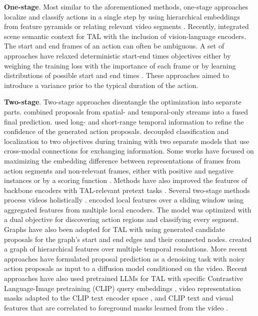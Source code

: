 \noindent
\textbf{One-stage}. Most similar to the aforementioned methods, one-stage approaches localize and classify actions in a single step by using hierarchical embeddings from feature pyramids  or relating relevant video segments . Recently,  integrated scene semantic context for TAL with the inclusion of vision-language encoders. The start and end frames of an action can often be ambiguous. A set of approaches have relaxed deterministic start-end times objectives either by weighing the training loss with the importance of each frame  or by
learning distributions of possible start and end times . These approaches aimed to introduce a variance prior to the typical duration of the action. 

\noindent
\textbf{Two-stage}. Two-stage approaches disentangle the optimization into separate parts.  combined proposals from spatial- and temporal-only streams into a fused final prediction.  used long- and short-range temporal information to refine the confidence of the generated action proposals.  decoupled classification and localization to two objectives during training with two separate models that use cross-modal connections for exchanging information. Some works have focused on maximizing the embedding difference between representations of frames from action segments and non-relevant frames, either with positive and negative instances  or by a scoring function . Methods have also improved the features of backbone encoders with TAL-relevant pretext tasks . Several two-stage methods process videos holistically .  encoded local features over a sliding window using aggregated features from multiple local encoders. The model was optimized with a dual objective for discovering action regions and classifying every segment. Graphs have also been adopted for TAL with  using generated candidate proposals for the graph's start and end edges and their connected nodes.  created a graph of hierarchical features over multiple temporal resolutions. More recent approaches  have formulated proposal prediction as a denoising task with noisy action proposals as input to a diffusion model conditioned on the video. Recent approaches have also used pretrained LLMs for TAL with specific Contrastive Language-Image pretraining (CLIP) query embeddings , video representation masks adapted to the CLIP text encoder space , and CLIP text and visual features that are correlated to foreground masks learned from the video .

